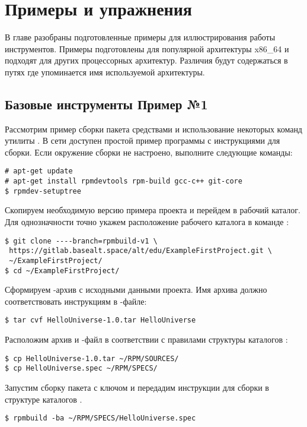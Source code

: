 \chapter{Примеры и упражнения}

В главе разобраны подготовленные примеры для иллюстрирования работы инструментов.
Примеры подготовлены для популярной архитектуры x86\_64 и подходят для других
процессорных архитектур. Различия будут содержаться в путях где упоминается имя
используемой архитектуры.

\section{Базовые инструменты  \textbf{Пример №1}}

Рассмотрим пример сборки пакета средствами  и использование
некоторых команд утилиты . В сети доступен простой пример 
программы с инструкциями для сборки.
Если окружение сборки  не настроено, выполните следующие команды:
\begin{verbatim}
# apt-get update
# apt-get install rpmdevtools rpm-build gcc-c++ git-core
$ rpmdev-setuptree
\end{verbatim}

Скопируем необходимую версию примера проекта и перейдем
в рабочий каталог. Для однозначности точно укажем расположение рабочего
каталога  в команде :
\begin{verbatim}
$ git clone ----branch=rpmbuild-v1 \
 https://gitlab.basealt.space/alt/edu/ExampleFirstProject.git \
 ~/ExampleFirstProject/
$ cd ~/ExampleFirstProject/
\end{verbatim}

Сформируем -архив с исходными данными проекта. Имя архива должно
соответствовать инструкциям в -файле:
\begin{verbatim}
$ tar cvf HelloUniverse-1.0.tar HelloUniverse
\end{verbatim}

Расположим архив и -файл в соответствии с правилами структуры каталогов
:
\begin{verbatim}
$ cp HelloUniverse-1.0.tar ~/RPM/SOURCES/
$ cp HelloUniverse.spec ~/RPM/SPECS/
\end{verbatim}

Запустим сборку пакета с ключом  и передадим инструкции для сборки
в структуре каталогов .
\begin{verbatim}
$ rpmbuild -ba ~/RPM/SPECS/HelloUniverse.spec
\end{verbatim}

